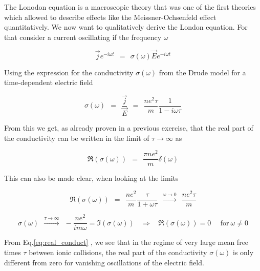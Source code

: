 \documentclass[10pt]{report}
\numberwithin{equation}{chapter}
\newcommand{\myEq}[1]{
  Eq.\ref{#1}
}
\begin{document}
The Lonodon equation is a macroscopic theory that was one of the first theories which allowed to describe effects like the Meissner-Ochsenfeld effect quantitatively.
We now want to qualitatively derive the London equation. For that consider a current oscillating if the frequency $\omega$

\begin{equation}\label{eq:osc_curr}
  \vec{j} e^{-i \omega t} ~~=~~ \sigma(\omega) \vec{E} e^{-i \omega t}
\end{equation}

Using the expression for the conductivity $\sigma(\omega)$ from the Drude model for a time-dependent electric field

\begin{equation}
  \sigma(\omega) ~~=~~ \frac{\vec{j}}{\vec{E}} ~~=~~ \frac{ne^2 \tau}{m} \frac{1}{1-i\omega \tau}
\end{equation}

%

From this we get, as already proven in a previous exercise, that the real part of the conductivity can be written in the limit of $\tau \rightarrow \infty$ as

\begin{equation}\label{eq:real_conduct}
  \Re(\sigma(\omega)) ~~=~~ \frac{\pi n e^2}{m} \delta(\omega)
\end{equation}


This can also be made clear, when looking at the limits

\begin{equation}
  \Re(\sigma(\omega)) ~~=~~ \frac{ne^2}{m} \frac{\tau}{1+\omega \tau}~~ \xrightarrow{\omega \rightarrow 0} ~~
  \frac{ne^2 \tau}{m}
\end{equation}

\begin{equation}
  \sigma(\omega) ~~ \xrightarrow{\tau \rightarrow \infty} ~~ -\frac{ne^2}{im\omega} = \Im(\sigma(\omega)) ~~~~ \Rightarrow ~~~~ \Re(\sigma(\omega)) = 0 ~~~~~~\text{for}\ \omega \neq 0
\end{equation}


From \myEq{eq:real_conduct}, we see that in the regime of very large mean free times $\tau$ between ionic collisions, the real part of the conductivity $\sigma(\omega)$ is only different from zero for vanishing oscillations of the electric field. 
\end{document}
